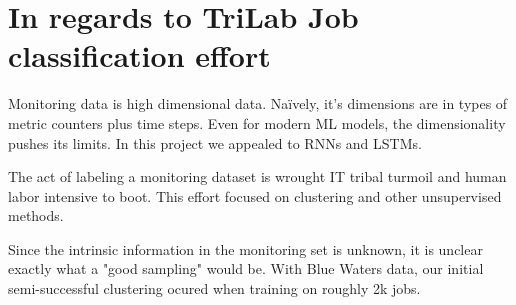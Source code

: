\section{In regards to TriLab Job classification effort}

Monitoring data is high dimensional data. Na\"{i}vely, it's dimensions are in types of metric counters plus time steps. Even for modern ML models, the dimensionality pushes its limits. In this project we appealed to RNNs and LSTMs.

The act of labeling a monitoring dataset is wrought IT tribal turmoil and human labor intensive to boot. This effort focused on clustering and other unsupervised methods.

Since the intrinsic information in the monitoring set is unknown, it is unclear exactly what a "good sampling" would be. With Blue Waters data, our initial semi-successful clustering ocured when training on roughly 2k jobs.